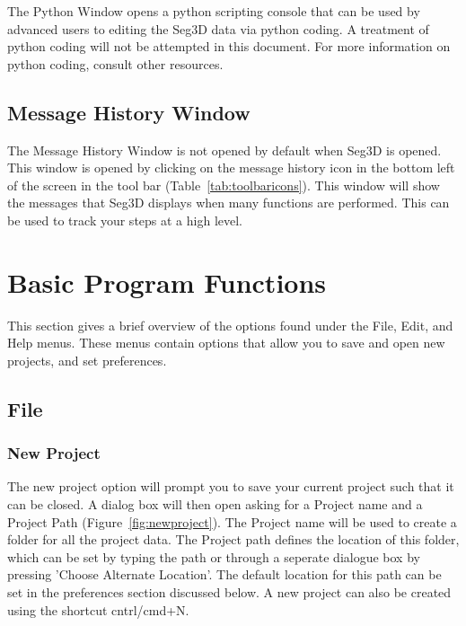 \documentclass[fleqn,11pt,openany]{book}
\begin{document}
The Python Window opens a python scripting console that can be used by advanced users to editing the Seg3D data via python coding.  A treatment of python coding will not be attempted in this document.  For more information on python coding, consult other resources.

\section{Message History Window}
\label{sec:messagehistory}
The Message History Window is not opened by default when Seg3D is opened.  This window is opened by clicking on the message history icon in the bottom left of the screen in the tool bar (Table~\ref{tab:toolbaricons}).    This window will show the messages that Seg3D displays when many functions are performed.  This can be used to track your steps at a high level.  




\chapter{Basic Program Functions}
\label{sec:functions}

\begin{introduction}
This section gives a brief overview of the options found under the File, Edit, and Help menus. These menus contain options
that allow you to save and open new projects, and set preferences. 

\end{introduction}

\section{File}
\label{sec:file}

\subsection{New Project}
\label{sec:newproject}
The new project option will prompt you to save your current project such that it can be closed. A dialog box will then open
asking for a Project name and a Project Path (Figure~\ref{fig:newproject}).  The Project name will be used to create a folder for all the project data.  The Project path defines the location of this folder, which can be set by typing the path or through a seperate dialogue box by pressing 'Choose Alternate Location'.  The default location for this path can be set in the preferences section discussed below. A new project can also be created using the shortcut cntrl/cmd+N.
\end{document}
